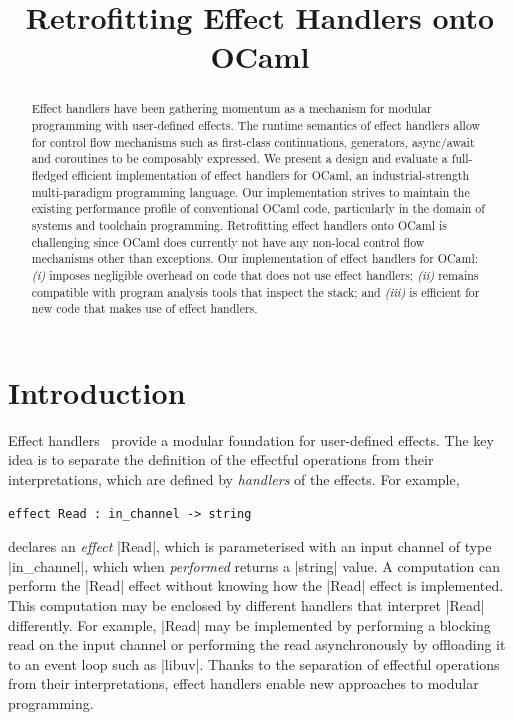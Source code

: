 \documentclass[sigplan,10pt,review,anonymous]{acmart}\settopmatter{printfolios=true,printccs=false,printacmref=false}
\begin{document}
\title{Retrofitting Effect Handlers onto OCaml}

\begin{abstract}
Effect handlers have been gathering momentum as a mechanism
for modular programming with user-defined effects. The runtime semantics of
effect handlers allow for control flow
mechanisms such as first-class continuations, generators, async/await and coroutines to be composably expressed. We present a design and evaluate a
full-fledged efficient implementation of effect handlers for OCaml, an industrial-strength multi-paradigm programming language. Our implementation strives to maintain the existing performance profile of conventional OCaml code, particularly in the domain of systems and toolchain programming. Retrofitting effect handlers onto OCaml is challenging since OCaml does currently not have any non-local control flow mechanisms other than exceptions. Our implementation of
effect handlers for OCaml: {\em (i)} imposes negligible overhead on code that does not use
effect handlers; {\em (ii)} remains compatible with program analysis tools that inspect the
stack; and {\em (iii)} is efficient for new code that makes use of effect handlers.
\end{abstract}

\maketitle

\section{Introduction}

Effect handlers~\cite{Plotkin09} provide a modular foundation for user-defined
effects. The key idea is to separate the definition of the effectful operations
from their interpretations, which are defined by \emph{handlers} of the
effects. For example,
%
\begin{lstlisting}
effect Read : in_channel -> string
\end{lstlisting}
%
declares an \emph{effect} |Read|, which is parameterised with an input channel
of type |in_channel|, which when \emph{performed} returns a |string| value. A
computation can perform the |Read| effect without knowing how the |Read| effect
is implemented. This computation may be enclosed by different handlers that
interpret |Read| differently. For example, |Read| may be implemented by
performing a blocking read on the input channel or performing the read
asynchronously by offloading it to an event loop such as |libuv|. Thanks to the
separation of effectful operations from their interpretations, effect handlers
enable new approaches to modular programming.
\end{document}
